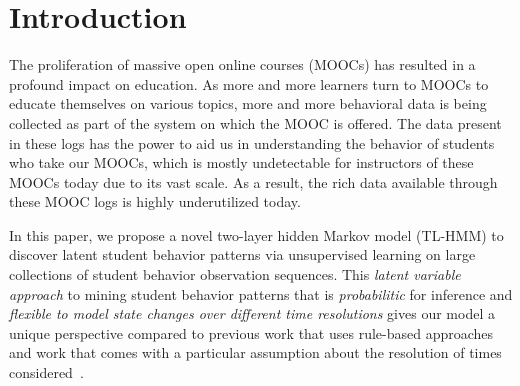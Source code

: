\section{Introduction}
The proliferation of massive open online courses (MOOCs) has resulted in a
profound impact on education. As more and more learners turn to MOOCs to
educate themselves on various topics, more and more behavioral data is
being collected as part of the system on which the MOOC is offered. The
data present in these logs has the power to aid us in understanding the
behavior of students who take our MOOCs, which is mostly undetectable for
instructors of these MOOCs today due to its vast scale. As a result, the
rich data available through these MOOC logs is highly underutilized today.

In this paper, we propose a novel two-layer hidden Markov model
(TL-HMM) to discover latent student behavior patterns via unsupervised
learning on large collections of student behavior observation sequences.
This \emph{latent variable approach} to mining student behavior
patterns that is \emph{probabilitic} for inference and \emph{flexible to
model state changes over different time resolutions} gives our model
a unique perspective compared to previous work that uses rule-based
approaches~\citep{Kizilcec:2013:LAK,Davis:2016:EDM} and work that comes
with a particular assumption about the resolution of times
considered~\citep{Faucon:2016:EDM, Kizilcec:2013:LAK}.
